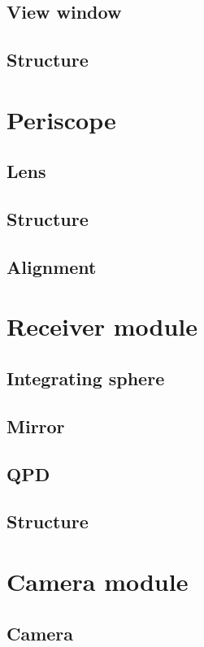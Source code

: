 \subsection{View window}
\subsection{Structure}

\section{Periscope}
\subsection{Lens}
\subsection{Structure}
\subsection{Alignment}

\section{Receiver module}
\subsection{Integrating sphere}
\subsection{Mirror}
\subsection{QPD}
\subsection{Structure}

\section{Camera module}
\subsection{Camera}
